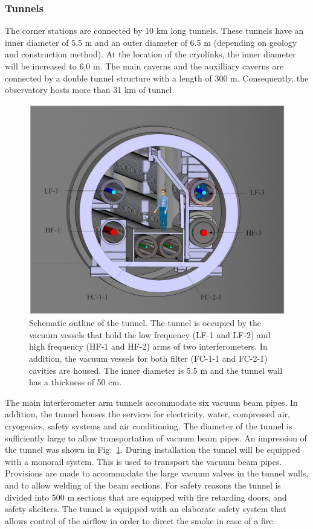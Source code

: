\subsubsection{Tunnels}
\label{subsec:tunnels}
The corner stations are connected by 10 km long tunnels. These tunnels have an inner diameter of 5.5 m and an outer diameter of 6.5 m (depending on geology and construction method). At the location of the cryolinks, the inner diameter will be increased to 6.0 m. The main caverns and the auxilliary caverns are connected by a double tunnel structure with a length of 300 m. Consequently, the observatory hosts more than 31 km of tunnel.
\begin{figure}[t!]
	\centering
	\includegraphics[width=12cm]{./Sec_SiteInfra/Figures/infra6.jpg}
	\caption{Schematic outline of the tunnel. The tunnel is occupied by the vacuum vessels that hold the low frequency (LF-1 and LF-2) and high frequency (HF-1 and HF-2) arms of two interferometers. In addition, the vacuum vessels for both filter (FC-1-1 and FC-2-1) cavities are housed. The inner diameter is 5.5 m and the tunnel wall has a thickness of 50 cm.}
	\label{fig:infra6}
\end{figure}

The main interferometer arm tunnels accommodate six vacuum beam pipes. In addition, the tunnel houses the services for electricity, water, compressed air, cryogenics, safety systems and air conditioning. The diameter of the tunnel is sufficiently large to allow transportation of vacuum beam pipes. An impression of the tunnel was shown in Fig.~\ref{fig:infra6}. During installation the tunnel will be equipped with a monorail system. This is used to transport the vacuum beam pipes. Provisions are made to accommodate the large vacuum valves in the tunnel walls, and to allow welding of the beam sections. For safety reasons the tunnel is divided into 500 m sections that are equipped with fire retarding doors, and safety shelters. The tunnel is equipped with an elaborate safety system that allows control of the airflow in order to direct the smoke in case of a fire.

